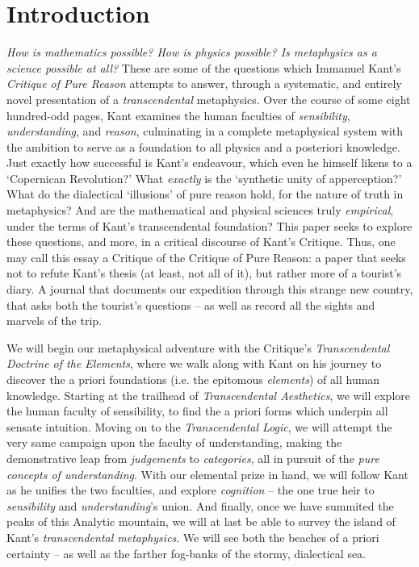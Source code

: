 \section*{Introduction}
\emph{How is mathematics possible? How is physics possible? Is metaphysics as a science possible at all?} These are some of the questions which Immanuel Kant's \emph{Critique of Pure Reason} attempts to answer, through a systematic, and entirely novel presentation of a \emph{transcendental} metaphysics. Over the course of some eight hundred-odd pages, Kant examines the human faculties of \emph{sensibility}, \emph{understanding}, and \emph{reason}, culminating in a complete metaphysical system with the ambition to serve as a foundation to all physics and a posteriori knowledge. Just exactly how successful is Kant's endeavour, which even he himself likens to a `Copernican Revolution?' What \emph{exactly} is the `synthetic unity of apperception?' What do the dialectical `illusions' of pure reason hold, for the nature of truth in metaphysics? And are the mathematical and physical sciences truly \emph{empirical}, under the terms of Kant's transcendental foundation? This paper seeks to explore these questions, and more, in a critical discourse of Kant's Critique. Thus, one may call this essay a Critique of the Critique of Pure Reason: a paper that seeks not to refute Kant's thesis (at least, not all of it), but rather more of a tourist's diary. A journal that documents our expedition through this strange new country, that asks both the tourist's questions -- as well as record all the sights and marvels of the trip.

We will begin our metaphysical adventure with the Critique's \emph{Transcendental Doctrine of the Elements}, where we walk along with Kant on his journey to discover the a priori foundations (i.e. the epitomous \emph{elements}) of all human knowledge. Starting at the trailhead of \emph{Transcendental Aesthetics}, we will explore the human faculty of sensibility, to find the a priori forms which underpin all sensate intuition. Moving on to the \emph{Transcendental Logic}, we will attempt the very same campaign upon the faculty of understanding, making the demonstrative leap from \emph{judgements} to \emph{categories}, all in pursuit of the \emph{pure concepts of understanding}. With our elemental prize in hand, we will follow Kant as he unifies the two faculties, and explore \emph{cognition} -- the one true heir to \emph{sensibility} and \emph{understanding}'s union. And finally, once we have summited the peaks of this Analytic mountain, we will at last be able to survey the island of Kant's \emph{transcendental metaphysics}. We will see both the beaches of a priori certainty -- as well as the farther fog-banks of the stormy, dialectical sea.
